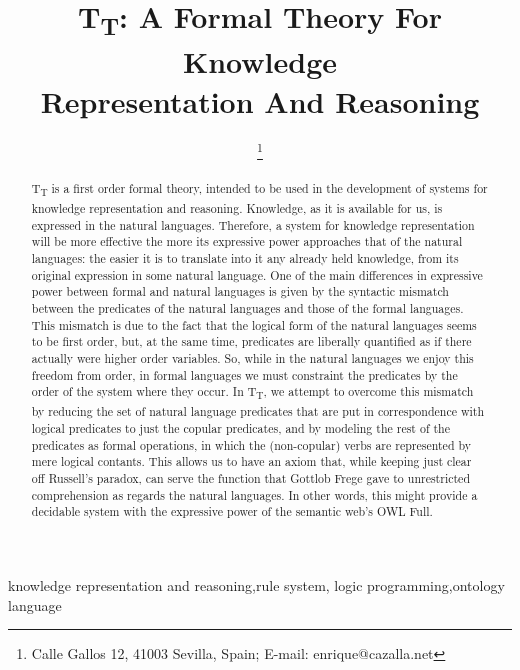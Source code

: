 \documentclass{IOS-Book-Article}     %
\def\hb{\hbox to 10.7 cm{}}
\begin{document}
\pagestyle{headings}
\def\thepage{}

\begin{frontmatter}          %
%
\title{T\textsubscript{T}: A Formal Theory For Knowledge\\
Representation And Reasoning}

\markboth{}{February 2016\hb}

\author{ 
\thanks{Calle Gallos 12, 41003 Sevilla, Spain; E-mail: enrique@cazalla.net}}
%
%
\begin{abstract}
T\textsubscript{T} is a first order formal theory, intended to be used in
the development of systems for knowledge representation and reasoning.
Knowledge, as it is available for us, is expressed in the natural languages.
Therefore, a system for knowledge representation will be more effective
the more its expressive power approaches that of the natural languages:
the easier it is to translate into it any already held knowledge, from its
original expression in some natural language.
One of the main differences in expressive power between formal and natural
languages is given by the
syntactic mismatch between the predicates of the natural
languages and those of the formal languages. This mismatch is due to the fact
that the logical form of the natural languages seems to be first order, but,
at the  same time, predicates are liberally quantified as if there
actually were higher order variables.
So, while in the natural languages we enjoy this freedom from order,
in formal languages we must constraint the predicates by the order of
the system where they occur.
In T\textsubscript{T}, we attempt to overcome this
mismatch by reducing the set of natural language predicates that are
put in correspondence with logical predicates to just the copular predicates,
and by modeling the rest of the predicates as formal operations,
in which the (non-copular) verbs are represented by mere logical contants.
This allows us to have an axiom that, while keeping just clear off
Russell's paradox, can serve the function that Gottlob Frege gave to
unrestricted comprehension as regards the natural languages. In other words,
this might provide a decidable system with the expressive power of the
semantic web's OWL Full.
\end{abstract}

\begin{keyword}
knowledge representation and reasoning\sep rule system\sep
logic programming\sep ontology language
\end{keyword}

\end{frontmatter}
\markboth{February 2016\hb}{February 2016\hb}
\end{document}
